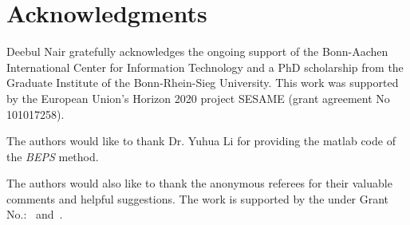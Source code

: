 \section{Acknowledgments}
Deebul Nair gratefully acknowledges the ongoing support
of the Bonn-Aachen International Center for Information Technology and a PhD
scholarship from the Graduate Institute of the Bonn-Rhein-Sieg University. This
work was supported by the European Union’s Horizon 2020 project SESAME (grant agreement No 101017258).


\begin{acks}
  The authors would like to thank Dr. Yuhua Li for providing the
  matlab code of  the \textit{BEPS} method. 

  The authors would also like to thank the anonymous referees for
  their valuable comments and helpful suggestions. The work is
  supported by the  under Grant
  No.:~
  and~.

\end{acks}
